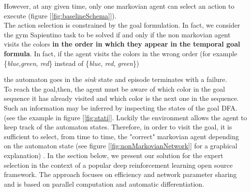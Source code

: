\documentclass{article}
\begin{document}
However, at any given time, only one markovian agent can select an action to execute (figure [\ref{fig:baselineSchema}]). \\
The action selection is constrained by the goal formulation. In fact, we consider the gym Sapientino task to be solved if and only if the non markovian agent visits the colors \textbf{in the order in which they appear in the temporal goal formula}. In fact, if the agent visits the colors in the wrong order (for example \{\textit{blue},\textit{green}, \textit{red}\} instead of \{\textit{blue}, \textit{red}, \textit{green}\}) 

the automaton goes in the \textit{sink} state and episode terminates with a failure.\\

\noindent
To reach the goal,then, the agent must be aware of which color in the goal sequence it has already visited and which color is the next one in the sequence. Such an information may be inferred by inspecting the states of the goal DFA. (see the example in figure [\ref{fig:stati}].
Luckily the environment allows the agent to keep track of the automaton states. 
Therefore, in order to visit the goal, it is sufficient to select, from time to time, the "correct" markovian agent depending on the automaton state (see figure [\ref{fig:nonMarkovianNetwork}] for a  graphical explanation) .
\noindent
In the section below, we present our solution for the expert selection in the context of a popular deep reinforcement learning open source framework. The approach focuses on efficiency and network parameter sharing and is based on parallel computation and automatic differentiation.\\




\newcommand{\inputnum}{7}

\newcommand{\hiddennum}{9}

\newcommand{\outputnum}{5}
\end{document}
